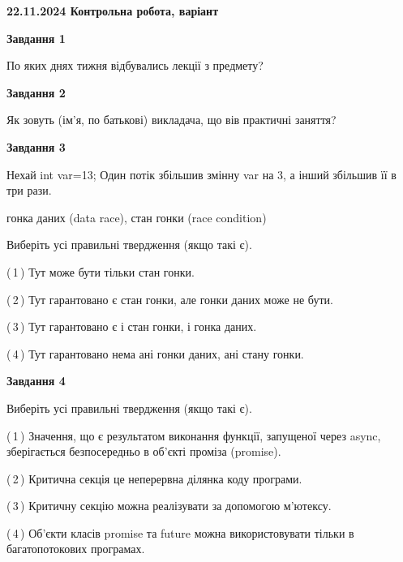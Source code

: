 \documentclass[12pt, ukrainian]{article}
\begin{document}
\begin {large}

\textbf{22.11.2024 Контрольна робота, варіант  }\par


{

\begin{center}
\textbf{Завдання 1}
\end{center}

По яких днях тижня відбувались лекції з предмету?


\begin{center}
\textbf{Завдання 2}
\end{center}

Як зовуть (ім'я, по батькові) викладача, що вів практичні заняття?


\begin{center}
\textbf{Завдання 3}
\end{center}

Нехай int var=13; Один потік збільшив змінну var на 3, а інший збільшив її в три рази.

гонка даних (data race), стан гонки (race condition)

Виберіть усі правильні твердження (якщо такі є).\par
\vspace{2mm}
(\,1\,) Тут може бути тільки стан гонки.%

(\,2\,) Тут гарантовано є стан гонки, але гонки даних може не бути.%

(\,3\,) Тут гарантовано є і стан гонки, і гонка даних.%

(\,4\,) Тут гарантовано нема ані гонки даних, ані стану гонки.%


\begin{center}
\textbf{Завдання 4}
\end{center}

Виберіть усі правильні твердження (якщо такі є).\par
\vspace{2mm}

(\,1\,) Значення, що є результатом виконання функції, запущеної через async, зберігається безпосередньо в об’єкті проміза (promise).%

(\,2\,) Критична секція це неперервна ділянка коду програми.%

(\,3\,) Критичну секцію можна реалізувати за допомогою м’ютексу.%

(\,4\,) Об’єкти класів promise та future можна використовувати тільки в багатопотокових програмах.%


}
\end{large}
\end{document}
